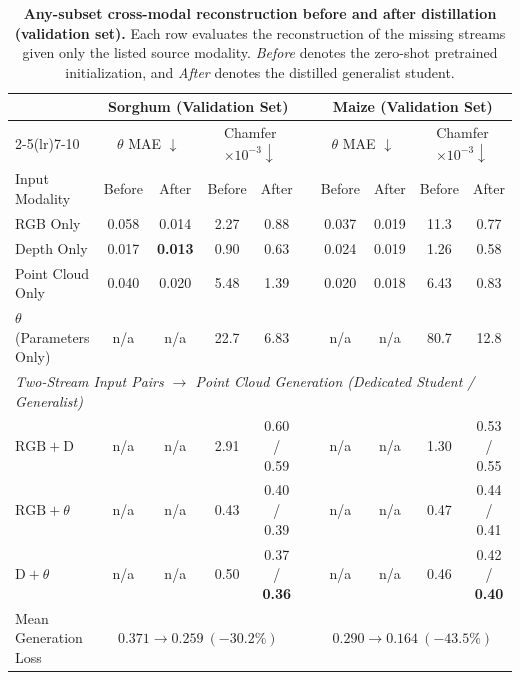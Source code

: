 \documentclass[10pt,twocolumn,letterpaper]{article}
\begin{document}
\begin{table}[t]
  \caption{\textbf{Any-subset cross-modal reconstruction before and after distillation (validation set).} Each row evaluates the reconstruction of the missing streams given only the listed source modality. \emph{Before} denotes the zero-shot pretrained initialization, and \emph{After} denotes the distilled generalist student.}
  \label{tab:anysubset}\label{tab:main}
  \centering\scriptsize
  \setlength{\tabcolsep}{3.6pt}
  \begin{tabular}{l cc cc c cc cc}
    \toprule
    & \multicolumn{4}{c}{Sorghum (Validation Set)} & & \multicolumn{4}{c}{Maize (Validation Set)} \\
    \cmidrule(lr){2-5}\cmidrule(lr){7-10}
    & \multicolumn{2}{c}{$\theta$ MAE $\downarrow$} & \multicolumn{2}{c}{Chamfer $\times10^{-3}\downarrow$} & & \multicolumn{2}{c}{$\theta$ MAE $\downarrow$} & \multicolumn{2}{c}{Chamfer $\times10^{-3}\downarrow$} \\
    Input Modality & Before & After & Before & After & & Before & After & Before & After \\
    \midrule
    RGB Only & 0.058 & 0.014 & 2.27 & 0.88 & & 0.037 & 0.019 & 11.3 & 0.77 \\
    Depth Only & 0.017 & \textbf{0.013} & 0.90 & 0.63 & & 0.024 & 0.019 & 1.26 & 0.58 \\
    Point Cloud Only & 0.040 & 0.020 & 5.48 & 1.39 & & 0.020 & 0.018 & 6.43 & 0.83 \\
    $\theta$ (Parameters Only) & n/a& n/a& 22.7 & 6.83 & & n/a& n/a& 80.7 & 12.8 \\
    \midrule
    \multicolumn{10}{l}{\emph{Two-Stream Input Pairs $\to$ Point Cloud Generation (Dedicated Student / Generalist)}} \\
    $\mathrm{RGB}+\mathrm{D}$ & n/a& n/a& 2.91 & 0.60 / 0.59 & & n/a& n/a& 1.30 & 0.53 / 0.55 \\
    $\mathrm{RGB}+\theta$ & n/a& n/a& 0.43 & 0.40 / 0.39 & & n/a& n/a& 0.47 & 0.44 / 0.41 \\
    $\mathrm{D}+\theta$ & n/a& n/a& 0.50 & 0.37 / \textbf{0.36} & & n/a& n/a& 0.46 & 0.42 / \textbf{0.40} \\
    \midrule
    Mean Generation Loss & \multicolumn{4}{c}{$0.371 \to 0.259\ (-30.2\%)$} & & \multicolumn{4}{c}{$0.290 \to 0.164\ (-43.5\%)$} \\
    \bottomrule
  \end{tabular}
\end{table}
\end{document}
